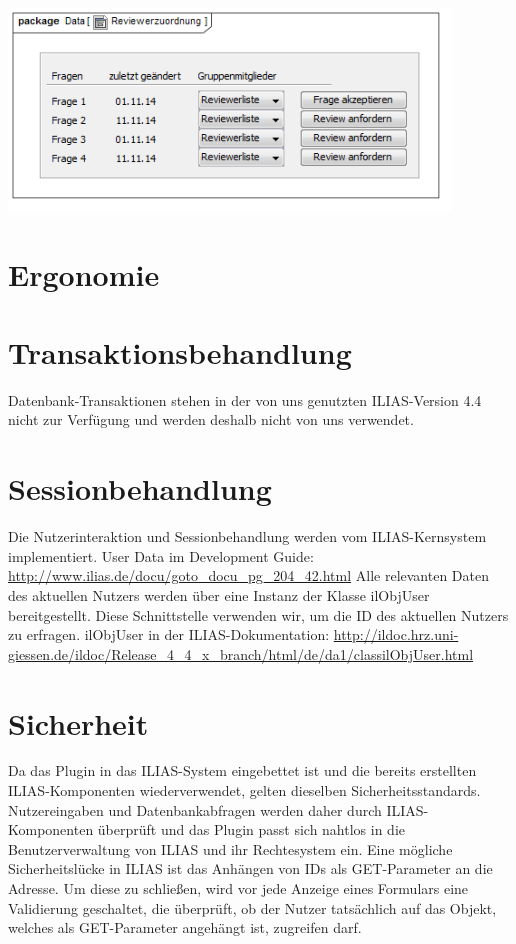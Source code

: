 \documentclass[a4paper]{scrreprt}
\begin{document}
\includegraphics[width=0.88\textwidth]{User_Interface_Modeling_Diagram__Reviewerzuordnung.png}
\label{Grafische Benutzeroberfläche Autor}\section{Ergonomie}


\section{Transaktionsbehandlung}

Datenbank-Transaktionen stehen in der von uns genutzten ILIAS-Version 4.4 nicht zur Verfügung und werden deshalb nicht von uns verwendet.

\section{Sessionbehandlung}

Die Nutzerinteraktion und Sessionbehandlung werden vom ILIAS-Kernsystem implementiert.
User Data im Development Guide: \url{http://www.ilias.de/docu/goto_docu_pg_204_42.html}
Alle relevanten Daten des aktuellen Nutzers werden über eine Instanz der Klasse ilObjUser bereitgestellt. 
Diese Schnittstelle verwenden wir, um die ID des aktuellen Nutzers zu erfragen.
ilObjUser in der ILIAS-Dokumentation: \url{http://ildoc.hrz.uni-giessen.de/ildoc/Release_4_4_x_branch/html/de/da1/classilObjUser.html}

\section{Sicherheit}

Da das Plugin in das ILIAS-System eingebettet ist und die bereits erstellten ILIAS-Komponenten wiederverwendet, gelten dieselben Sicherheitsstandards. 
Nutzereingaben und Datenbankabfragen werden daher durch ILIAS-Komponenten überprüft und das Plugin passt sich nahtlos in die Benutzerverwaltung von ILIAS und ihr Rechtesystem ein. 
Eine mögliche Sicherheitslücke in ILIAS ist das Anhängen von IDs als GET-Parameter an die Adresse. 
Um diese zu schließen, wird vor jede Anzeige eines Formulars eine Validierung geschaltet, die überprüft, ob der Nutzer tatsächlich auf das Objekt, welches als GET-Parameter angehängt ist, zugreifen darf.
\end{document}
